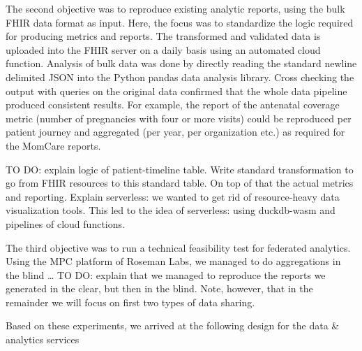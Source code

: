 \documentclass[
  authoryear]{elsarticle}
\begin{document}
The second objective was to reproduce existing analytic reports, using
the bulk FHIR data format as input. Here, the focus was to standardize
the logic required for producing metrics and reports. The transformed
and validated data is uploaded into the FHIR server on a daily basis
using an automated cloud function. Analysis of bulk data was done by
directly reading the standard newline delimited JSON into the Python
pandas data analysis library. Cross checking the output with queries on
the original data confirmed that the whole data pipeline produced
consistent results. For example, the report of the antenatal coverage
metric (number of pregnancies with four or more visits) could be
reproduced per patient journey and aggregated (per year, per
organization etc.) as required for the MomCare reports.

TO DO: explain logic of patient-timeline table. Write standard
transformation to go from FHIR resources to this standard table. On top
of that the actual metrics and reporting. Explain serverless: we wanted
to get rid of resource-heavy data visualization tools. This led to the
idea of serverless: using duckdb-wasm and pipelines of cloud functions.

The third objective was to run a technical feasibility test for
federated analytics. Using the MPC platform of Roseman Labs, we managed
to do aggregations in the blind \ldots{} TO DO: explain that we managed
to reproduce the reports we generated in the clear, but then in the
blind. Note, however, that in the remainder we will focus on first two
types of data sharing.

Based on these experiments, we arrived at the following design for the
data \& analytics services
\end{document}

